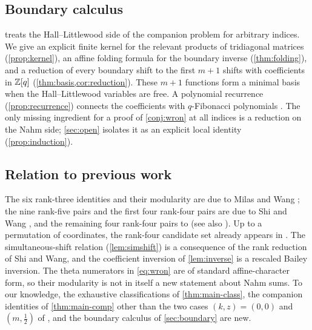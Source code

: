 \subsection{Boundary calculus}
 treats the Hall--Littlewood side of the companion problem for arbitrary indices. We give an explicit finite kernel for the relevant products of tridiagonal matrices (\cref{prop:kernel}), an affine folding formula for the boundary inverse (\cref{thm:folding}), and a reduction of every boundary shift to the first $m+1$ shifts with coefficients in $\mathbb{Z}[q]$ (\cref{thm:basis,cor:reduction}). These $m+1$ functions form a minimal basis when the Hall--Littlewood variables are free. A polynomial recurrence (\cref{prop:recurrence}) connects the coefficients with $q$-Fibonacci polynomials \cite{Cigler03}. The only missing ingredient for a proof of \cref{conj:wron} at all indices is a reduction on the Nahm side; \cref{sec:open} isolates it as an explicit local identity (\cref{prop:induction}).

\subsection{Relation to previous work}
The six rank-three identities and their modularity are due to Milas and Wang \cite{MW24}; the nine rank-five pairs and the first four rank-four pairs are due to Shi and Wang \cite{SW26}, and the remaining four rank-four pairs to \cite{SW26b} (see also \cite{Li26}). Up to a permutation of coordinates, the rank-four candidate set already appears in \cite[Table~3]{CW25}. The simultaneous-shift relation (\cref{lem:simshift}) is a consequence of the rank reduction of Shi and Wang, and the coefficient inversion of \cref{lem:inverse} is a rescaled Bailey inversion. The theta numerators in \eqref{eq:wron} are of standard affine-character form, so their modularity is not in itself a new statement about Nahm sums. To our knowledge, the exhaustive classifications of \cref{thm:main-class}, the companion identities of \cref{thm:main-comp} other than the two cases $(k,z)=(0,0)$ and $(m,\frac12)$ of \cite{CTW26}, and the boundary calculus of \cref{sec:boundary} are new.

